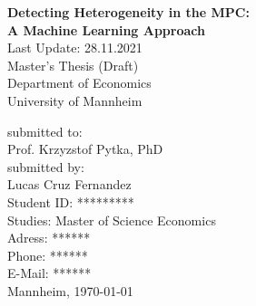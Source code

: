 \begin{titlepage}

\begin{center}

\vspace*{1,2cm}

\Large {\bfseries Detecting Heterogeneity in the MPC: \\ A Machine Learning Approach}\\[2cm]
\large {Last Update: 28.11.2021}\\[1cm]

\large {Master's Thesis (Draft)}\\[1cm]
\large {Department of Economics}\\[0.2cm]

\large {University of Mannheim}\\[0.5cm]

\end{center}

\vfill

\noindent submitted to:\\
Prof. Krzyzstof Pytka, PhD\\[0.5cm]
submitted by:\\
Lucas Cruz Fernandez\\[0.5cm]
Student ID: *********\\
Studies: Master of Science Economics \\[0.5cm]
Adress: ****** \\
Phone: ****** \\
E-Mail: ****** \\[0.5cm]
Mannheim, \today

\setcounter{page}{0}

\end{titlepage}
